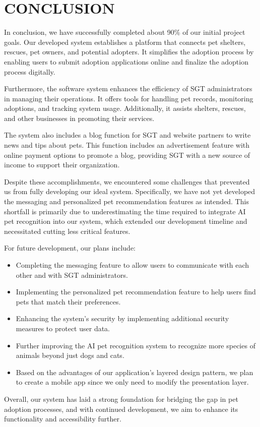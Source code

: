 \chapter{CONCLUSION}

In conclusion, we have successfully completed about 90\% of our initial project goals. Our developed system establishes a platform that connects pet shelters, rescues, pet owners, and potential adopters. It simplifies the adoption process by enabling users to submit adoption applications online and finalize the adoption process digitally.

Furthermore, the software system enhances the efficiency of SGT administrators in managing their operations. It offers tools for handling pet records, monitoring adoptions, and tracking system usage. Additionally, it assists shelters, rescues, and other businesses in promoting their services.

The system also includes a blog function for SGT and website partners to write news and tips about pets. This function includes an advertisement feature with online payment options to promote a blog, providing SGT with a new source of income to support their organization.

Despite these accomplishments, we encountered some challenges that prevented us from fully developing our ideal system. Specifically, we have not yet developed the messaging and personalized pet recommendation features as intended. This shortfall is primarily due to underestimating the time required to integrate AI pet recognition into our system, which extended our development timeline and necessitated cutting less critical features.

For future development, our plans include:

\begin{itemize}
    \item Completing the messaging feature to allow users to communicate with each other and with SGT administrators.
    \item Implementing the personalized pet recommendation feature to help users find pets that match their preferences.
    \item Enhancing the system's security by implementing additional security measures to protect user data.
    \item Further improving the AI pet recognition system to recognize more species of animals beyond just dogs and cats.
    \item Based on the advantages of our application's layered design pattern, we plan to create a mobile app since we only need to modify the presentation layer.
\end{itemize}

Overall, our system has laid a strong foundation for bridging the gap in pet adoption processes, and with continued development, we aim to enhance its functionality and accessibility further.